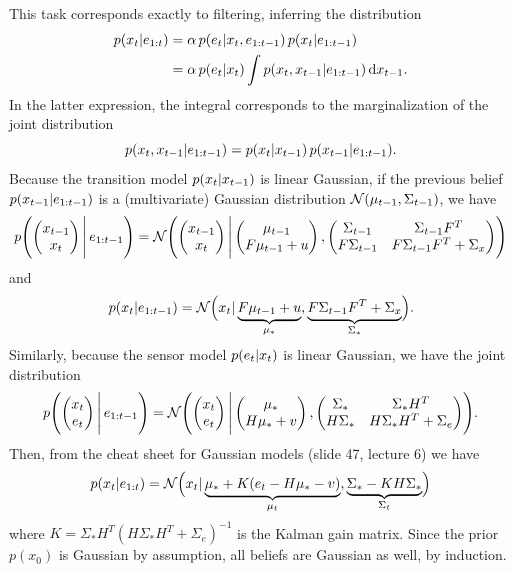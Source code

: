 \documentclass[11pt, a4paper]{article}
\begin{document}
\begin{enumerate}
    \begin{solution}
        This task corresponds exactly to filtering, \ie{} inferring the distribution
        \begin{align*}
            p(x_t \knowing e_{1:t}) & = \alpha \, p(e_t \knowing x_t, e_{1:t-1}) \, p(x_t \knowing e_{1:t-1}) \\
            & = \alpha \, p(e_t \knowing x_t) \int p(x_t, x_{t-1} \knowing e_{1:t-1}) \d{x_{t-1}} .
        \end{align*}
        In the latter expression, the integral corresponds to the marginalization of the joint distribution
        \begin{equation*}
            p(x_t, x_{t-1} \knowing e_{1:t-1}) = p(x_t \knowing x_{t-1}) \, p(x_{t-1} \knowing e_{1:t-1}) .
        \end{equation*}
        Because the transition model $p(x_t \knowing x_{t-1})$ is linear Gaussian, if the previous belief $p(x_{t-1} \knowing e_{1:t-1})$ is a (multivariate) Gaussian distribution $\N(\mu_{t-1}, \Sigma_{t-1})$, we have
        \begin{equation*}
            p\rbk*{ \mat{x_{t-1} \\ x_t} \Bigg\knowing \, e_{1:t-1} } = \N\rbk*{ \mat{x_{t-1} \\ x_t} \Bigg\knowing \mat{\mu_{t-1} \\ F \mu_{t-1} + u}, \mat{ \Sigma_{t-1} & \Sigma_{t-1} F^T \\ F \Sigma_{t-1} & F \Sigma_{t-1} F^T + \Sigma_x } }
        \end{equation*}
        and
        \begin{equation*}
            p(x_t \knowing e_{1:t-1}) = \N\rbk[\Big]{x_t \knowing \underbrace{F \mu_{t-1} + u}_{\mu_*}, \underbrace{F \Sigma_{t-1} F^T + \Sigma_x}_{\Sigma_*} } .
        \end{equation*}
        Similarly, because the sensor model $p(e_t \knowing x_t)$ is linear Gaussian, we have the joint distribution
        \begin{equation*}
            p\rbk*{ \mat{x_t \\ e_t} \Bigg\knowing \, e_{1:t-1} } = \N\rbk*{ \mat{x_t \\ e_t} \Bigg\knowing \mat{\mu_* \\ H \mu_* + v}, \mat{ \Sigma_* & \Sigma_* H^T \\ H \Sigma_* & H \Sigma_* H^T + \Sigma_e } }.
        \end{equation*}
        Then, from the cheat sheet for Gaussian models (slide 47, lecture 6) we have
        \begin{equation*}
            p(x_t \knowing e_{1:t}) = \N\rbk[\Big]{x_t \knowing \underbrace{\mu_* + K (e_t - H \mu_* - v)}_{\mu_t}, \underbrace{\Sigma_* - K H \Sigma_*}_{\Sigma_t} }
        \end{equation*}
        where $K = \Sigma_* H^T (H \Sigma_* H^T + \Sigma_e)^{-1}$ is the Kalman gain matrix. Since the prior $p(x_0)$ is Gaussian by assumption, all beliefs are Gaussian as well, by induction.
    \end{solution}


\end{enumerate}
\end{document}
